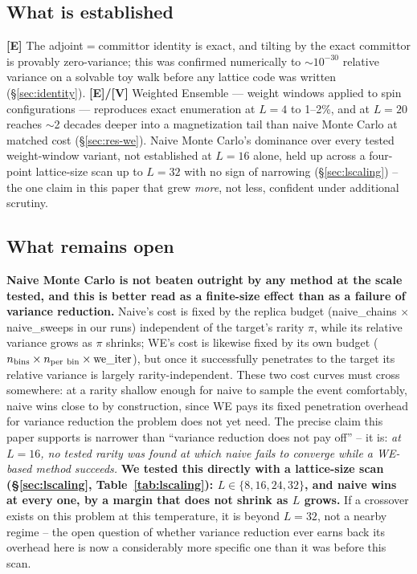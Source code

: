 \documentclass[a4paper,fleqn]{cas-sc}
\begin{document}
\subsection{What is established}
\textbf{[E]} The adjoint$=$committor identity is exact, and tilting by the exact committor
is provably zero-variance; this was confirmed numerically to $\sim\!10^{-30}$ relative
variance on a solvable toy walk before any lattice code was written (\S\ref{sec:identity}).
\textbf{[E]/[V]} Weighted Ensemble --- weight windows applied to spin configurations ---
reproduces exact enumeration at $L=4$ to 1--2\%, and at $L=20$ reaches $\sim$2 decades
deeper into a magnetization tail than naive Monte Carlo at matched cost
(\S\ref{sec:res-we}). Naive Monte Carlo's dominance over every tested weight-window
variant, not established at $L=16$ alone, held up across a four-point lattice-size scan
up to $L=32$ with no sign of narrowing (\S\ref{sec:lscaling}) -- the one claim in this
paper that grew \emph{more}, not less, confident under additional scrutiny.

\subsection{What remains open}
\textbf{Naive Monte Carlo is not beaten outright by any method at the scale tested, and
	this is better read as a finite-size effect than as a failure of variance reduction.}
Naive's cost is fixed by the replica budget (naive\_chains $\times$ naive\_sweeps in our
runs) independent of the target's rarity $\pi$, while its relative variance grows as
$\pi$ shrinks; WE's cost is likewise fixed by its own budget ($n_{\rm bins}\times n_{\rm
	per\ bin}\times\mathrm{we\_iter}$), but once it successfully penetrates to the target its
relative variance is largely rarity-independent. These two cost curves must cross
somewhere: at a rarity shallow enough for naive to sample the event comfortably, naive
wins close to by construction, since WE pays its fixed penetration overhead for variance
reduction the problem does not yet need. The precise claim this paper supports is
narrower than ``variance reduction does not pay off'' -- it is: \emph{at $L=16$, no tested
	rarity was found at which naive fails to converge while a WE-based method succeeds.}
\textbf{We tested this directly with a lattice-size scan (\S\ref{sec:lscaling},
	Table~\ref{tab:lscaling}): $L\in\{8,16,24,32\}$, and naive wins at every one, by a margin
	that does not shrink as $L$ grows.} If a crossover exists on this problem at this
temperature, it is beyond $L=32$, not a nearby regime -- the open question of whether
variance reduction ever earns back its overhead here is now a considerably more specific
one than it was before this scan.
\end{document}
